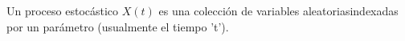 \documentclass[preview]{standalone}
\begin{document}
\begin{center}
Un proceso estocástico $X(t)$ es una colección de variables aleatoriasindexadas por un parámetro (usualmente el tiempo 't').
\end{center}
\end{document}
